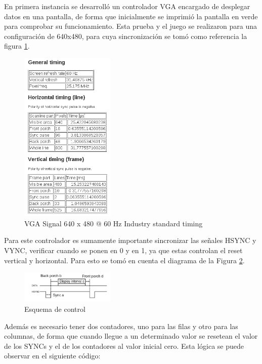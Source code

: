 \documentclass[10pt]{article}
\begin{document}
En primera instancia se desarrolló un controlador VGA encargado de desplegar datos en una pantalla, de forma que inicialmente se imprimió la pantalla en verde para comprobar su funcionamiento. Esta prueba y el juego se realizaron para una configuración de 640x480, para cuya sincronización se tomó como referencia la figura \ref{vga-data}.\\

\begin{figure}[hbtp]
\centering
\includegraphics[width=0.4\textwidth]{vga-data.png}
\caption{VGA Signal 640 x 480 @ 60 Hz Industry standard timing}
\label{vga-data}
\end{figure}

Para este controlador es sumamente importante sincronizar las señales HSYNC y VYNC, verificar cuando se ponen en 0 y en 1, ya que estas controlan el reset vertical y horizontal. Para esto se tomó en cuenta el diagrama de la Figura \ref{vga-pulse}.\\

\begin{figure}[hbtp]
\centering
\includegraphics[width=0.4\textwidth]{vga-pulse.png}
\caption{Esquema de control}
\label{vga-pulse}
\end{figure}

Además es necesario tener dos contadores, uno para las filas y otro para las columnas, de forma que cuando llegue a un determinado valor se resetean el valor de los SYNCs y el de los contadores al valor inicial cero. Esta lógica se puede observar en el siguiente código:\\
\end{document}
